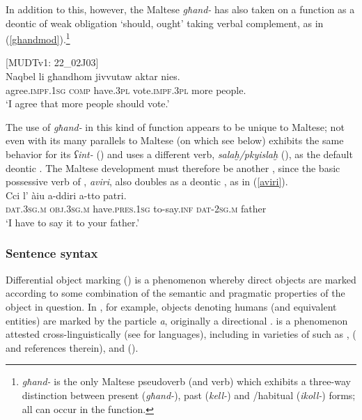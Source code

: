 \documentclass[output=paper]{langsci/langscibook}
\begin{document}
In addition to this, however, the Maltese \textit{għand-} has also taken on a function as a deontic  of weak obligation `should, ought' taking verbal complement, as in (\ref{ghandmod}).\footnote{\textit{għand-} is the only Maltese pseudoverb (and verb) which exhibits a three-way distinction between present (\textit{għand-}), past (\textit{kell-}) and /habitual (\textit{ikoll-}) forms; all can occur in the  function.}

\ea\label{ghandmod}
{[MUDTv1: 22\_02J03]} \\
    \gll Naqbel	li għandhom jivvutaw aktar nies.\\
	agree.\textsc{impf.1sg} \textsc{comp} have.\textsc{3pl} vote.\textsc{impf.3pl} more people.\\
	\glt `I agree that more people should vote.'\\
\z

The use of \textit{għand-} in this kind of  function appears to be unique to Maltese; not even   with its many parallels to Maltese (on which see below) exhibits the same behavior for its  \textit{ʕint-} (\citealt[346]{Borg2004}) and uses a different verb, \textit{salaḫ/pkyislaḫ} (\citealt[323]{Borg2004}), as the default deontic . The Maltese development must therefore be another , since the basic possessive verb of , \textit{aviri}, also doubles as a deontic , as in (\ref{aviri}).
\ea\label{aviri}
    \\
    \gll Cci l' àiu a-ddiri a-tto patri.\\
	\textsc{dat.3sg.m} \textsc{obj.3sg.m} have.\textsc{pres.1sg} to-say.\textsc{inf} \textsc{dat-2sg.m} father\\
	\glt `I have to say it to your father.'\\
\z

\subsubsection{Sentence syntax}\largerpage
{} %
Differential object marking () is a phenomenon whereby direct objects are marked according to some combination of the semantic and pragmatic properties of the object in question. In , for example, objects denoting humans (and equivalent entities) are marked by the particle \textit{a}, originally a directional .  is a phenomenon attested cross-linguistically (see \citealt{Khan1984} for  languages), including in varieties of  such as ,  (\citealt{Coghill2014} and references therein), and  (\citealt[108]{Andalusi2013}).
\end{document}
